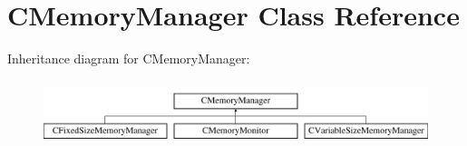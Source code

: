 \hypertarget{classCMemoryManager}{\section{\-C\-Memory\-Manager \-Class \-Reference}
\label{classCMemoryManager}
}
\-Inheritance diagram for \-C\-Memory\-Manager\-:\begin{figure}[H]
\begin{center}
\leavevmode
\includegraphics[height=1.885522cm]{classCMemoryManager}
\end{center}
\end{figure}
